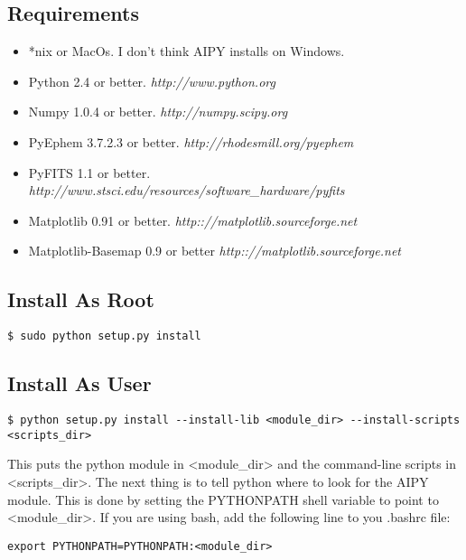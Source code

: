 \documentclass[10pt]{article}
\begin{document}
\subsection{Requirements}

\begin{itemize}
\item[] *nix or MacOs.  I don't think AIPY installs on Windows.
\item[] Python 2.4 or better.  {\it http://www.python.org}
\item[] Numpy 1.0.4 or better. {\it http://numpy.scipy.org}
\item[] PyEphem 3.7.2.3 or better. {\it http://rhodesmill.org/pyephem}
\item[] PyFITS 1.1 or better. {\it http://www.stsci.edu/resources/software\_hardware/pyfits}
\item[] Matplotlib 0.91 or better. {\it http:://matplotlib.sourceforge.net}
\item[] Matplotlib-Basemap 0.9 or better {\it http:://matplotlib.sourceforge.net}
\end{itemize}

\subsection{Install As Root}

\begin{verbatim}
$ sudo python setup.py install
\end{verbatim}

\subsection{Install As User}

\begin{verbatim}
$ python setup.py install --install-lib <module_dir> --install-scripts <scripts_dir>
\end{verbatim}

This puts the python module in <module\_dir> and the command-line scripts
in <scripts\_dir>.  The next thing is to tell python where to look
for the AIPY module.  This is done by setting the PYTHONPATH shell variable
to point to <module\_dir>.  If you are using bash, add the following line
to you .bashrc file:
\begin{verbatim}
export PYTHONPATH=PYTHONPATH:<module_dir>
\end{verbatim}

\clearpage

\clearpage

\clearpage

\clearpage

\clearpage

\clearpage

\clearpage

\clearpage

\clearpage

\clearpage

\clearpage

\clearpage

\clearpage

\clearpage

\end{document}
